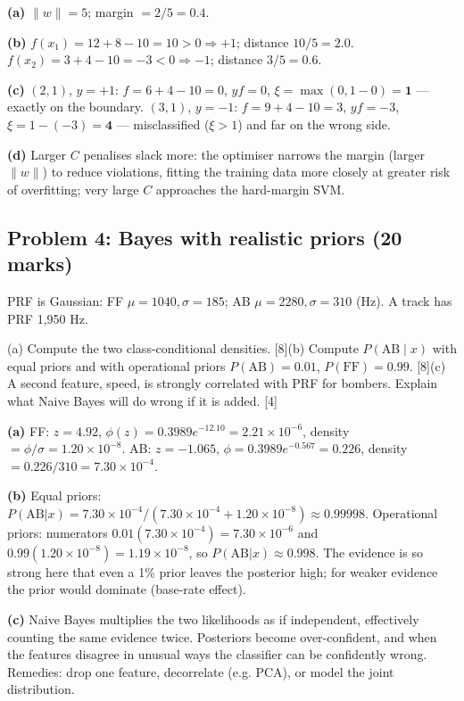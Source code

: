 \documentclass[11pt]{article}
\begin{document}
\begin{soln}\textbf{(a)} $\|w\|=5$; margin $=2/5=\mathbf{0.4}$.

\textbf{(b)} $f(x_1)=12+8-10=10>0\Rightarrow+1$; distance $10/5=2.0$. $f(x_2)=3+4-10=-3<0\Rightarrow-1$; distance $3/5=0.6$.

\textbf{(c)} $(2,1)$, $y=+1$: $f=6+4-10=0$, $y f=0$, $\xi=\max(0,1-0)=\mathbf{1}$ --- exactly on the boundary. $(3,1)$, $y=-1$: $f=9+4-10=3$, $yf=-3$, $\xi=1-(-3)=\mathbf{4}$ --- misclassified ($\xi>1$) and far on the wrong side.

\textbf{(d)} Larger $C$ penalises slack more: the optimiser narrows the margin (larger $\|w\|$) to reduce violations, fitting the training data more closely at greater risk of overfitting; very large $C$ approaches the hard-margin SVM.\end{soln}

\subsection{Problem 4: Bayes with realistic priors \normalfont\small\color{GreyN}(20 marks)}

\begin{prob}PRF is Gaussian: FF $\mu=1040,\sigma=185$; AB $\mu=2280,\sigma=310$ (Hz). A track has PRF 1,950 Hz.

(a) Compute the two class-conditional densities. [8]\newline (b) Compute $P(\text{AB}\mid x)$ with equal priors and with operational priors $P(\text{AB})=0.01$, $P(\text{FF})=0.99$. [8]\newline (c) A second feature, speed, is strongly correlated with PRF for bombers. Explain what Naive Bayes will do wrong if it is added. [4]\end{prob}

\begin{soln}\textbf{(a)} FF: $z=4.92$, $\phi(z)=0.3989e^{-12.10}=2.21\times10^{-6}$, density $=\phi/\sigma=1.20\times10^{-8}$. AB: $z=-1.065$, $\phi=0.3989e^{-0.567}=0.226$, density $=0.226/310=7.30\times10^{-4}$.

\textbf{(b)} Equal priors: $P(\text{AB}|x)=7.30\times10^{-4}/(7.30\times10^{-4}+1.20\times10^{-8})\approx\mathbf{0.99998}$. Operational priors: numerators $0.01(7.30\times10^{-4})=7.30\times10^{-6}$ and $0.99(1.20\times10^{-8})=1.19\times10^{-8}$, so $P(\text{AB}|x)\approx\mathbf{0.998}$. The evidence is so strong here that even a 1\% prior leaves the posterior high; for weaker evidence the prior would dominate (base-rate effect).

\textbf{(c)} Naive Bayes multiplies the two likelihoods as if independent, effectively counting the same evidence twice. Posteriors become over-confident, and when the features disagree in unusual ways the classifier can be confidently wrong. Remedies: drop one feature, decorrelate (e.g. PCA), or model the joint distribution.\end{soln}
\end{document}

